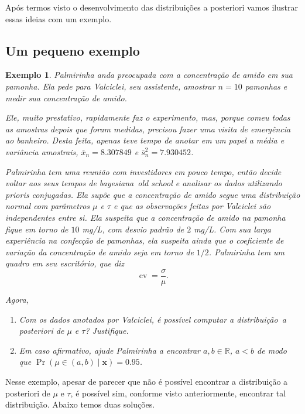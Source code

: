 \documentclass{article}
\newtheorem{example}{Exemplo}
\begin{document}
Após termos visto o desenvolvimento das distribuições a posteriori vamos ilustrar essas ideias com um exemplo.

\subsection*{Um pequeno exemplo}

\begin{example}
    Palmirinha anda preocupada com a concentração de amido em sua pamonha. Ela pede para Valciclei, seu assistente, amostrar $n=10$ pamonhas e medir sua concentração de amido.
    
    Ele, muito prestativo, rapidamente faz o experimento, mas, porque comeu todas as amostras depois que foram medidas, precisou fazer uma visita de emergência ao banheiro. Desta feita, apenas teve tempo de anotar em um papel a média e variância amostrais, $\bar{x}_n =  8.307849$ e $\bar{s}^2_n = 7.930452$.
    
    Palmirinha tem uma reunião com investidores em pouco tempo, então decide voltar aos seus tempos de bayesiana~\textit{old school} e analisar os dados utilizando prioris conjugadas. Ela supõe que a concentração de amido segue uma distribuição normal com parâmetros $\mu$ e $\tau$ e que as observações feitas por Valciclei são independentes entre si. Ela suspeita que a concentração de amido na pamonha fique em torno de $10$ mg/L, com desvio padrão de $2$ mg/L. Com sua larga experiência na confecção de pamonhas, ela suspeita ainda que o coeficiente de variação da concentração de amido seja em torno de $1/2$. Palmirinha tem um quadro em seu escritório, que diz
    \[\operatorname{cv} = \frac{\sigma}{\mu}.\]
    
    Agora, 
    \begin{enumerate}
        \item
            Com os dados anotados por Valciclei, é possível computar a distribuição~\textit{a posteriori} de $\mu$ e $\tau$? Justifique.
            
        \item
            Em caso afirmativo, ajude Palmirinha a encontrar $a, b \in \mathbb{R}$, $a < b$ de modo que $\operatorname{Pr}(\mu \in (a, b) \mid \boldsymbol{x}) = 0.95$.
    \end{enumerate}
\end{example}

Nesse exemplo, apesar de parecer que não é possível encontrar a distribuição a posteriori de $\mu$ e $\tau$, é possível sim, conforme visto anteriormente, encontrar tal distribuição. Abaixo temos duas soluções.
\end{document}
